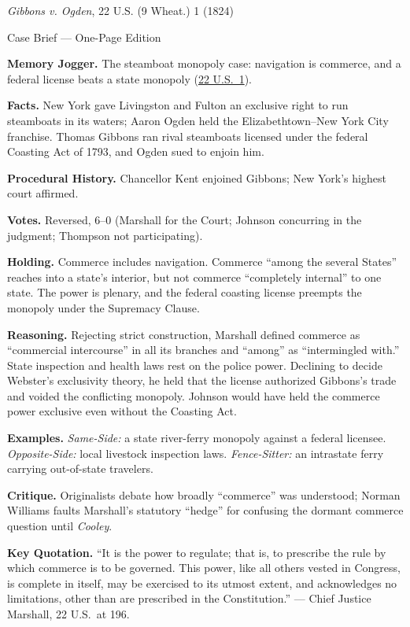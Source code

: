\documentclass[12pt]{article}
\begin{document}
\begin{center}
{\Large \textit{Gibbons v. Ogden}, 22 U.S. (9 Wheat.) 1 (1824)\par}
\vspace{0.3em}
{\normalsize Case Brief --- One-Page Edition\par}
\end{center}

\textbf{Memory Jogger.} The steamboat monopoly case: navigation is commerce, and a federal license beats a state monopoly (\href{https://www.courtlistener.com/opinion/85412/gibbons-v-ogden/}{22 U.S.\ 1}).

\textbf{Facts.} New York gave Livingston and Fulton an exclusive right to run steamboats in its waters; Aaron Ogden held the Elizabethtown--New York City franchise. Thomas Gibbons ran rival steamboats licensed under the federal Coasting Act of 1793, and Ogden sued to enjoin him.

\textbf{Procedural History.} Chancellor Kent enjoined Gibbons; New York's highest court affirmed.

\textbf{Votes.} Reversed, 6--0 (Marshall for the Court; Johnson concurring in the judgment; Thompson not participating).

\textbf{Holding.} Commerce includes navigation. Commerce ``among the several States'' reaches into a state's interior, but not commerce ``completely internal'' to one state. The power is plenary, and the federal coasting license preempts the monopoly under the Supremacy Clause.

\textbf{Reasoning.} Rejecting strict construction, Marshall defined commerce as ``commercial intercourse'' in all its branches and ``among'' as ``intermingled with.'' State inspection and health laws rest on the police power. Declining to decide Webster's exclusivity theory, he held that the license authorized Gibbons's trade and voided the conflicting monopoly. Johnson would have held the commerce power exclusive even without the Coasting Act.

\textbf{Examples.} \emph{Same-Side:} a state river-ferry monopoly against a federal licensee. \emph{Opposite-Side:} local livestock inspection laws. \emph{Fence-Sitter:} an intrastate ferry carrying out-of-state travelers.

\textbf{Critique.} Originalists debate how broadly ``commerce'' was understood; Norman Williams faults Marshall's statutory ``hedge'' for confusing the dormant commerce question until \textit{Cooley}.

\textbf{Key Quotation.} ``It is the power to regulate; that is, to prescribe the rule by which commerce is to be governed. This power, like all others vested in Congress, is complete in itself, may be exercised to its utmost extent, and acknowledges no limitations, other than are prescribed in the Constitution.'' --- Chief Justice Marshall, 22 U.S.\ at 196.
\end{document}

